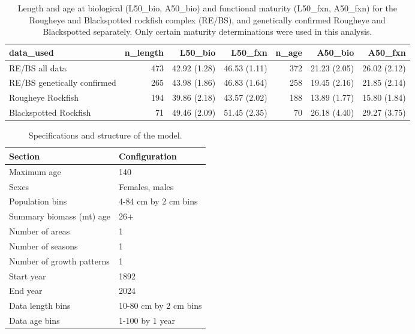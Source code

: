 \documentclass[
]{scrartcl}
\begin{document}
\begin{longtable}{lrrrrrr}

\caption{\label{tbl-maturity_estimates}Length and age at biological
(L50\_bio, A50\_bio) and functional maturity (L50\_fxn, A50\_fxn) for
the Rougheye and Blackspotted rockfish complex (RE/BS), and genetically
confirmed Rougheye and Blackspotted separately. Only certain maturity
determinations were used in this analysis.}

\tabularnewline

\toprule
data\_used & n\_length & L50\_bio & L50\_fxn & n\_age & A50\_bio & A50\_fxn \\ 
\midrule\addlinespace[2.5pt]
RE/BS all data & 473 & 42.92 (1.28) & 46.53 (1.11) & 372 & 21.23 (2.05) & 26.02 (2.12) \\ 
RE/BS genetically confirmed & 265 & 43.98 (1.86) & 46.83 (1.64) & 258 & 19.45 (2.16) & 21.85 (2.14) \\ 
Rougheye Rockfish & 194 & 39.86 (2.18) & 43.57 (2.02) & 188 & 13.89 (1.77) & 15.80 (1.84) \\ 
Blackspotted Rockfish & 71 & 49.46 (2.09) & 51.45 (2.35) & 70 & 26.18 (4.40) & 29.27 (3.75) \\ 
\bottomrule

\end{longtable}

\endgroup

\newpage{}

\begingroup
\fontsize{9.0pt}{10.8pt}\selectfont

\begin{longtable}{ll}

\caption{\label{tbl-model-config}Specifications and structure of the
model.}

\tabularnewline

\toprule
Section & Configuration \\ 
\midrule\addlinespace[2.5pt]
Maximum age & 140 \\ 
Sexes & Females, males \\ 
Population bins & 4-84 cm by 2 cm bins \\ 
Summary biomass (mt) age & 26+ \\ 
Number of areas & 1 \\ 
Number of seasons & 1 \\ 
Number of growth patterns & 1 \\ 
Start year & 1892 \\ 
End year & 2024 \\ 
Data length bins & 10-80 cm by 2 cm bins \\ 
Data age bins & 1-100 by 1 year \\ 
\bottomrule

\end{longtable}
\end{document}
